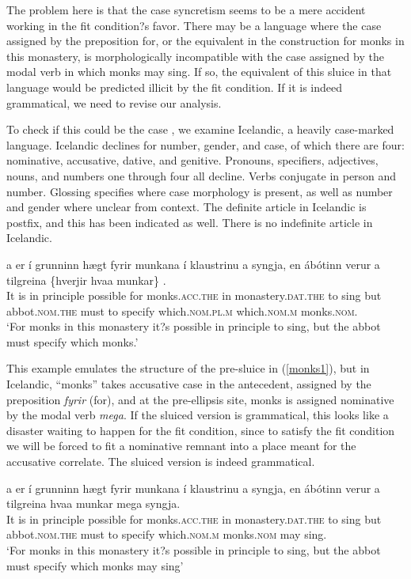 \documentclass{turabian-researchpaper}
\begin{document}
\noindent The problem here is that the case syncretism seems to be a mere accident working in the fit condition?s favor. There may be a language where the case assigned by the preposition for, or the equivalent in the construction for monks in this monastery, is morphologically incompatible with the case assigned by the modal verb in which monks may sing. If so, the equivalent of this sluice in that language would be predicted illicit by the fit condition. If it is indeed grammatical, we need to revise our analysis. 

To check if this could be the case , we examine Icelandic, a heavily case-marked language. Icelandic declines for number, gender, and case, of which there are four: nominative, accusative, dative, and genitive. Pronouns, specifiers, adjectives, nouns, and numbers one through four all decline. Verbs conjugate in person and number. Glossing specifies where case morphology is present, as well as number and gender where unclear from context. The definite article in Icelandic is postfix, and this has been indicated as well. There is no indefinite article in Icelandic. 

\begin{exe}
\ex\label{monksis1}
\gll \TH a{\dh} er \'i  grunninn h\ae gt fyrir munkana \'i klaustrinu a{\dh} syngja, en \'ab\'otinn ver\dh ur a{\dh} tilgreina \{hverjir \textbar hva\dh a munkar\} . \\
It is in principle possible for monks.\textsc{acc.the}  in monastery.\textsc{dat.the}  to   sing         but  abbot.\textsc{nom.the} must    to  specify   which.\textsc{nom.pl.m} which.\textsc{nom.m} monks.\textsc{nom}.\\ 
\trans `For monks in this monastery it?s possible in principle to sing, but the abbot must specify which monks.'
\end{exe}

This example emulates the structure of the pre-sluice in (\ref{monks1}), but in Icelandic, ``monks'' takes accusative case in the antecedent, assigned by the preposition \textit{fyrir} (for), and at the pre-ellipsis site, monks is assigned nominative by the modal verb \textit{mega}. If the sluiced version is grammatical, this looks like a disaster waiting to happen for the fit condition, since to satisfy the fit condition we will be forced to fit a nominative remnant into a place meant for the accusative correlate. The sluiced version is indeed grammatical. 

\begin{exe}
\ex\label{monksis2}
\gll \TH a{\dh} er \'i  grunninn h\ae gt fyrir munkana \'i klaustrinu a{\dh} syngja, en \'ab\'otinn ver\dh ur a{\dh} tilgreina hva\dh a munkar mega syngja. \\
It is in principle possible for monks.\textsc{acc.the}  in monastery.\textsc{dat.the}  to   sing         but  abbot.\textsc{nom.the} must    to  specify   which.\textsc{nom.m} monks.\textsc{nom} may  sing.\\ 
\trans `For monks in this monastery it?s possible in principle to sing, but the abbot must specify which monks may sing'
\end{exe}
\end{document}
